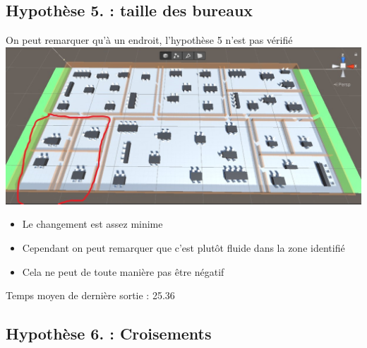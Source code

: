 \documentclass[12pt]{article}
\begin{document}
\subsection{Hypothèse 5. : taille des bureaux}
On peut remarquer qu'à un endroit, l'hypothèse 5 n'est pas vérifié
\newline
\includegraphics[scale=0.5]{Batiment problème 5..jpg}
\newline
\begin{itemize}
    \item Le changement est assez minime 
    \item Cependant on peut remarquer que c'est plutôt fluide dans la zone identifié
    \item Cela ne peut de toute manière pas être négatif
\end{itemize}
Temps moyen de dernière sortie : 25.36
\subsection{Hypothèse 6. : Croisements}
\end{document}
